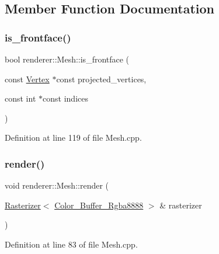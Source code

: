 \subsection{Member Function Documentation}
\mbox{\label{classrenderer_1_1_mesh_a693d10fdfac269136fe703a53a7cc27e}} 
\subsubsection{\texorpdfstring{is\_frontface()}{is\_frontface()}}
{\footnotesize\ttfamily bool renderer\+::\+Mesh\+::is\+\_\+frontface (\begin{DoxyParamCaption}\item[{const \mbox{\hyperlink{classrenderer_1_1_mesh_ab0cb2995275ebaa8ae9e5fbb5519b7f3}{Vertex}} $\ast$const}]{projected\+\_\+vertices,  }\item[{const int $\ast$const}]{indices }\end{DoxyParamCaption})\hspace{0.3cm}{\ttfamily [private]}}



Definition at line 119 of file Mesh.\+cpp.

\mbox{\label{classrenderer_1_1_mesh_a09c57a296515d4db731b2aa0f4eba284}} 
\subsubsection{\texorpdfstring{render()}{render()}}
{\footnotesize\ttfamily void renderer\+::\+Mesh\+::render (\begin{DoxyParamCaption}\item[{\mbox{\hyperlink{classrenderer_1_1_rasterizer}{Rasterizer}}$<$ \mbox{\hyperlink{classrenderer_1_1_color___buffer___rgba8888}{Color\+\_\+\+Buffer\+\_\+\+Rgba8888}} $>$ \&}]{rasterizer }\end{DoxyParamCaption})}



Definition at line 83 of file Mesh.\+cpp.

\mbox{\label{classrenderer_1_1_mesh_aa2e7ea68a34e4f2f5853136c1efcff7a}} 
